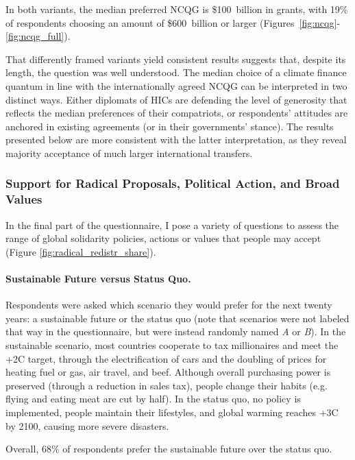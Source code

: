 \documentclass[12pt,english]{article}
\begin{document}
\begin{bibunit}
In both variants, the median preferred NCQG is \$100~billion in grants, with 19\% of respondents choosing an amount of \$600~billion or larger (Figures~\ref{fig:ncqg}-\ref{fig:ncqg_full}). 

That differently framed variants yield consistent results suggests that, despite its length, the question was well understood. 
The median choice of a climate finance quantum in line with the internationally agreed NCQG can be interpreted in two distinct ways. Either diplomats of HICs are defending the level of generosity that reflects the median preferences of their compatriots, or respondents' attitudes are anchored in existing agreements (or in their governments' stance). The results presented below are more consistent with the latter interpretation, as they reveal majority acceptance of much larger international transfers.


\subsubsection{Support for Radical Proposals, Political Action, and Broad Values}\label{subsec:radical}

In the final part of the questionnaire, I pose a variety of questions to assess the range of global solidarity policies, actions or values that people may accept (Figure \ref{fig:radical_redistr_share}).

\paragraph{Sustainable Future versus Status Quo.}\label{par:sustainable_future}

Respondents were asked which scenario they would prefer for the next twenty years: a sustainable future or the status quo (note that scenarios were not labeled that way in the questionnaire, but were instead randomly named \textit{A} or \textit{B}). In the sustainable scenario, most countries cooperate to tax millionaires and meet the +2\textdegree{}C target, through the electrification of cars and the doubling of prices for heating fuel or gas, air travel, and beef. Although overall purchasing power is preserved (through a reduction in sales tax), people change their habits (e.g. flying and eating meat are cut by half). In the status quo, no policy is implemented, people maintain their lifestyles, and global warming reaches +3\textdegree{}C by 2100, causing more severe disasters.

Overall, 68\% of respondents prefer the sustainable future over the status quo.


\end{bibunit}
\end{document}
